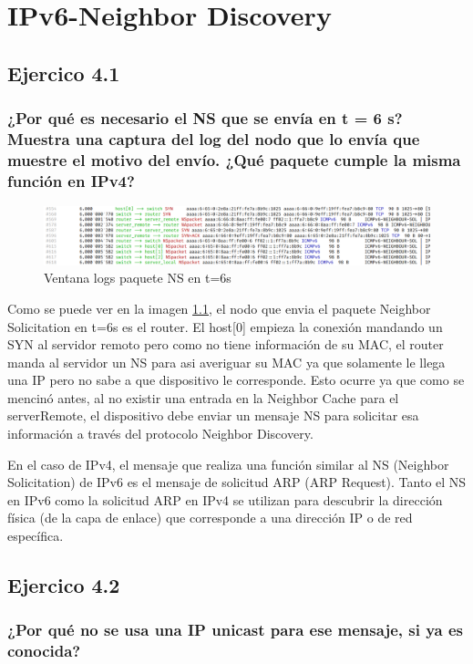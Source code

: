 \chapter{IPv6-Neighbor Discovery}
\label{chap:ipv6_nd}

\section{Ejercico 4.1}
\subsection{¿Por qué es necesario el NS que se envía en t = 6 s? Muestra una captura del log del nodo que lo envía que muestre el motivo del envío. ¿Qué paquete cumple la misma función en IPv4?}

\begin{figure}[H]
    \centering
    \includegraphics[width=135mm, scale=0.75]{imaxes/captura_ejer4_1.png}
    \caption{Ventana logs paquete NS en t=6s}
    \label{fig:logs_ns_t6}
\end{figure}

Como se puede ver en la imagen \ref{fig:logs_ns_t6}, el nodo que envia el paquete Neighbor Solicitation en t=6s es el router. El host[0] empieza la conexión mandando un SYN al servidor remoto pero como no tiene información de su MAC, el router manda al servidor un NS para asi averiguar su MAC ya que solamente le llega una IP pero no sabe a que dispositivo le corresponde. Esto ocurre ya que como se mencinó antes, al no existir una entrada en la Neighbor Cache para el serverRemote, el dispositivo debe enviar un mensaje NS para solicitar esa información a través del protocolo Neighbor Discovery.

En el caso de IPv4, el mensaje que realiza una función similar al NS (Neighbor Solicitation) de IPv6 es el mensaje de solicitud ARP (ARP Request). Tanto el NS en IPv6 como la solicitud ARP en IPv4 se utilizan para descubrir la dirección física (de la capa de enlace) que corresponde a una dirección IP o de red específica.

\section{Ejercico 4.2}
\subsection{¿Por qué no se usa una IP unicast para ese mensaje, si ya es conocida?}

